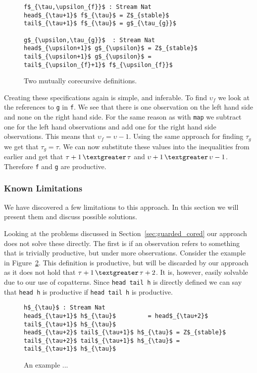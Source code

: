 \begin{figure}
\begin{Verbatim}[commandchars=\\\{\},codes={\catcode`$=3\catcode`_=8}]
f$_{\tau,\upsilon_{f}}$ : Stream Nat
head$_{\tau+1}$ f$_{\tau}$ = Z$_{stable}$
tail$_{\tau+1}$ f$_{\tau}$ = g$_{\tau_{g}}$

g$_{\upsilon,\tau_{g}}$  : Stream Nat
head$_{\upsilon+1}$ g$_{\upsilon}$ = Z$_{stable}$
tail$_{\upsilon+1}$ g$_{\upsilon}$ = tail$_{\upsilon_{f}+1}$ f$_{\upsilon_{f}}$
\end{Verbatim}
\caption{Two mutually corecursive definitions.}
\label{fig:mutRec1}
\end{figure}

Creating these specifications again is simple, and inferable. To find $\upsilon_{f}$ we look at the references to \texttt{g} in \texttt{f}. We see that there is one observation on the left hand side and none on the right hand side. For the same reason as with \texttt{map} we subtract one for the left hand observations and add one for the right hand side observations. This means that $\upsilon_{f} = \upsilon - 1$. Using the same approach for finding $\tau_{g}$ we get that $\tau_{g} = \tau$. We can now substitute these values into the inequalities from earlier and get that $\tau+1\,\textgreater\,\tau$ and $\upsilon+1\,\textgreater\,\upsilon - 1$. Therefore \texttt{f} and \texttt{g} are productive.

\subsubsection{Known Limitations}
We have discovered a few limitations to this approach. In this section we will present them and discuss possible solutions.

Looking at the problems discussed in Section~\ref{sec:guarded_cored} our approach does not solve these directly. The first is if an observation refers to something that is trivially productive, but under more observations. Consider the example in Figure~\ref{fig:forwardRef}. This definition is productive, but will be discarded by our approach as it does not hold that $\tau+1\,\textgreater\,\tau+2$. It is, however, easily solvable due to our use of copatterns. Since \texttt{head tail h} is directly defined we can say that \texttt{head h} is productive if \texttt{head tail h} is productive.

\begin{figure}
\begin{Verbatim}[commandchars=\\\{\},codes={\catcode`$=3\catcode`_=8}]
h$_{\tau}$ : Stream Nat
head$_{\tau+1}$ h$_{\tau}$         = head$_{\tau+2}$ tail$_{\tau+1}$ h$_{\tau}$
head$_{\tau+2}$ tail$_{\tau+1}$ h$_{\tau}$ = Z$_{stable}$
tail$_{\tau+2}$ tail$_{\tau+1}$ h$_{\tau}$ = tail$_{\tau+1}$ h$_{\tau}$
\end{Verbatim}
\caption{An example ...}
\label{fig:forwardRef}
\end{figure}

